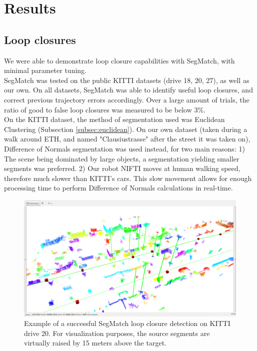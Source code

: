 \section{Results}
\label{sec:segmatch-results}


\subsection{Loop closures}

We were able to demonstrate loop closure capabilities with SegMatch, with minimal parameter tuning.\\

SegMatch was tested on the public KITTI datasets (drive 18, 20, 27), as well as our own. On all datasets, SegMatch was able to identify useful loop closures, and correct previous trajectory errors accordingly. Over a large amount of trials, the ratio of good to false loop closures was measured to be below 3\%.\\

On the KITTI dataset, the method of segmentation used was Euclidean Clustering (Subsection \ref{subsec:euclidean}). On our own dataset (taken during a walk around ETH, and named "Clausiustrasse" after the street it was taken on), Difference of Normals segmentation was used instead, for two main reasons: 1) The scene being dominated by large objects, a segmentation yielding smaller segments was preferred. 2) Our robot NIFTI moves at human walking speed, therefore much slower than KITTI's cars. This slow movement allows for enough processing time to perform Difference of Normals calculations in real-time.\\

\begin{figure}
  \centering
  \includegraphics[width=5.2in]{images/segmatchae.png}
  \caption{Example of a successful SegMatch loop closure detection on KITTI drive 20. For visualization purposes, the source segments are virtually raised by 15 meters above the target.}
  \label{fig:segmatch-loop-closure}
\end{figure}

